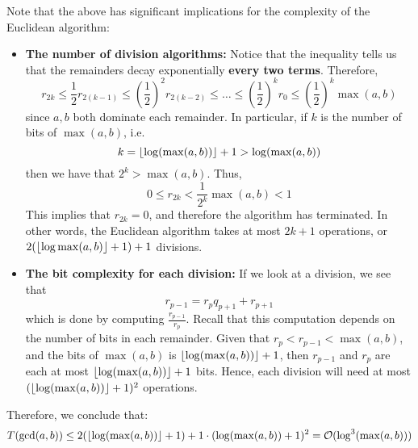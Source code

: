 \documentclass{article}
\begin{document}
Note that the above has significant implications for the complexity of the Euclidean algorithm:
\begin{itemize}
    \item \textbf{The number of division algorithms:}
        Notice that the inequality tells us that the remainders decay exponentially
        \textbf{every two terms}. Therefore,
        \begin{equation*}
            r_{2k} \leq \dfrac{1}{2}r_{2(k-1)} \leq \left( \dfrac{1}{2} \right)^{2} r_{2(k-2)}
            \leq \dots \leq \left( \dfrac{1}{2} \right)^{k}r_{0} \leq \left( \dfrac{1}{2} \right)^{k} \max(a, b)
        \end{equation*}
        since $ a, b $ both dominate each remainder.
        In particular, if $ k $ is the number of bits of $ \max(a, b) $, i.e.
        \begin{equation*}
            k = \left\lfloor{\log(\max(a, b))}\right\rfloor + 1 > \log(\max(a, b))
        \end{equation*}
        then we have that $ 2^{k} > \max(a, b) $. Thus,
        \begin{equation*}
            0 \leq r_{2k} < \dfrac{1}{2^{k}}\max(a, b) < 1
        \end{equation*}
        This implies that $ r_{2k} = 0 $, and therefore the algorithm has terminated.
        In other words, the Euclidean algorithm takes at most $ 2k + 1 $ operations,
        or $ 2(\left\lfloor{\log\max(a, b)}\right\rfloor+1)+1 $ divisions.

    \item \textbf{The bit complexity for each division:}
        If we look at a division, we see that
        \begin{equation*}
            r_{p-1} = r_{p}q_{p+1}+r_{p+1}
        \end{equation*}
        which is done by computing $ \frac{r_{p-1}}{r_{p}} $.
        Recall that this computation depends on the number of bits in each remainder.
        Given that $ r_{p} < r_{p-1} < \max(a, b) $, and the bits of $ \max(a, b) $ is
        $ \left\lfloor{\log(\max(a, b))}\right\rfloor + 1 $, then $ r_{p-1} $ and $ r_{p} $ are each at most
        $ \left\lfloor{\log(\max(a, b))}\right\rfloor + 1 $ bits.
        Hence, each division will need at most $ (\left\lfloor{\log(\max(a, b))}\right\rfloor+1)^{2} $ operations.
\end{itemize}

Therefore, we conclude that:
\begin{equation*}
    T(\gcd(a, b)) \leq 2(\left\lfloor{\log(\max(a, b))}\right\rfloor+1)+1 \cdot (\log(\max(a, b))+1)^{2}
    = \mathcal{O}(\log^{3}(\max(a, b)))
\end{equation*}
\end{document}
